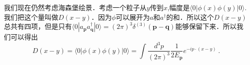 
我们现在仍然考虑海森堡绘景．考虑一个粒子从$y$传到$x$,幅度是$\langle 0 |\phi(x)\phi(y)| 0 \rangle$.我们把这个量叫做$D(x-y)$．因为$\phi$可以展开为$a$和$a^\dagger$的和．所以这个$D(x-y)$总共有四项，但是只有$\langle 0 | a_{\mathbf p} a^\dagger_{\mathbf q} | 0 \rangle = (2\pi)^3 \delta^{(3)}(\mathbf p - \mathbf q)$能够保留下来．所以我们可以得出
\begin{equation}
D(x-y)=\langle 0|\phi(x) \phi(y)| 0\rangle=\int \frac{d^{3} p}{(2 \pi)^{3}} \frac{1}{2 E_{\mathbf{p}}} e^{-i p \cdot(x-y)}~.
\end{equation}


